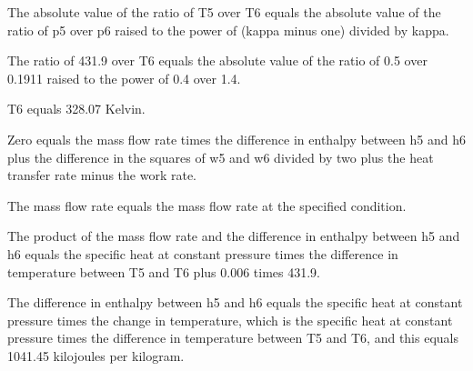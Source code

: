 The absolute value of the ratio of T5 over T6 equals the absolute value of the ratio of p5 over p6 raised to the power of (kappa minus one) divided by kappa.

The ratio of 431.9 over T6 equals the absolute value of the ratio of 0.5 over 0.1911 raised to the power of 0.4 over 1.4.

T6 equals 328.07 Kelvin.

Zero equals the mass flow rate times the difference in enthalpy between h5 and h6 plus the difference in the squares of w5 and w6 divided by two plus the heat transfer rate minus the work rate.

The mass flow rate equals the mass flow rate at the specified condition.

The product of the mass flow rate and the difference in enthalpy between h5 and h6 equals the specific heat at constant pressure times the difference in temperature between T5 and T6 plus 0.006 times 431.9.

The difference in enthalpy between h5 and h6 equals the specific heat at constant pressure times the change in temperature, which is the specific heat at constant pressure times the difference in temperature between T5 and T6, and this equals 1041.45 kilojoules per kilogram.